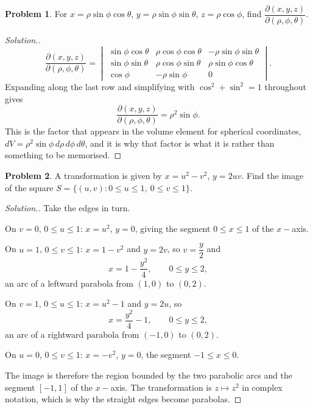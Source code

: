 \documentclass[11pt,a4paper]{article}
\theoremstyle{definition}
\newtheorem{problemx}{Problem}[subsection]
\newenvironment{problem}{\begin{problemx}}{\end{problemx}}
\newenvironment{solution}
  {\renewcommand{\qedsymbol}{}\begin{proof}[\textit{Solution}.]}
  {\end{proof}}
\begin{document}
\begin{problem}
For $x = \rho\sin\phi\cos\theta$, $y = \rho\sin\phi\sin\theta$,
$z = \rho\cos\phi$, find
$\dfrac{\partial(x,y,z)}{\partial(\rho,\phi,\theta)}$.
\end{problem}
\begin{solution}
$$\frac{\partial(x,y,z)}{\partial(\rho,\phi,\theta)}
= \begin{vmatrix}
\sin\phi\cos\theta & \rho\cos\phi\cos\theta & -\rho\sin\phi\sin\theta\\
\sin\phi\sin\theta & \rho\cos\phi\sin\theta & \rho\sin\phi\cos\theta\\
\cos\phi & -\rho\sin\phi & 0
\end{vmatrix}.$$
Expanding along the last row and simplifying with
$\cos^2+\sin^2 = 1$ throughout gives
$$\frac{\partial(x,y,z)}{\partial(\rho,\phi,\theta)} = \rho^2\sin\phi .$$
This is the factor that appears in the volume element for spherical
coordinates, $dV = \rho^2\sin\phi\,d\rho\,d\phi\,d\theta$, and it is why that
factor is what it is rather than something to be memorised.
\end{solution}

\begin{problem}
A transformation is given by $x = u^2-v^2$, $y = 2uv$. Find the image of the
square $S = \{(u,v): 0\leq u\leq 1,\ 0\leq v\leq 1\}$.
\end{problem}
\begin{solution}
Take the edges in turn.

On $v=0$, $0\leq u\leq 1$: $x = u^2$, $y = 0$, giving the segment
$0\leq x\leq 1$ of the $x-$axis.

On $u=1$, $0\leq v\leq 1$: $x = 1-v^2$ and $y = 2v$, so $v = \dfrac y2$ and
$$x = 1-\frac{y^2}{4},\qquad 0\leq y\leq 2 ,$$
an arc of a leftward parabola from $(1,0)$ to $(0,2)$.

On $v=1$, $0\leq u\leq 1$: $x = u^2-1$ and $y = 2u$, so
$$x = \frac{y^2}{4}-1,\qquad 0\leq y\leq 2 ,$$
an arc of a rightward parabola from $(-1,0)$ to $(0,2)$.

On $u=0$, $0\leq v\leq 1$: $x = -v^2$, $y = 0$, the segment $-1\leq x\leq 0$.

The image is therefore the region bounded by the two parabolic arcs and the
segment $[-1,1]$ of the $x-$axis. The transformation is $z\mapsto z^2$ in
complex notation, which is why the straight edges become parabolas.
\end{solution}
\end{document}
